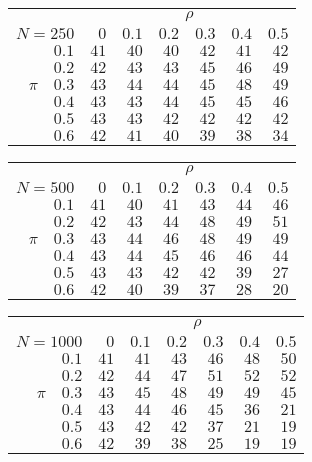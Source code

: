 \begin{tabular}{r|rrrrrr}
\hline\hline
 &\multicolumn{6}{c}{$\rho$} \\ 
 $N = 250$ & $0$ & $0.1$ & $0.2$ & $0.3$ & $0.4$ & $0.5$ \\ 
 \hline$0.1$ & $41$ & $40$ & $40$ & $42$ & $41$ & $42$\\ 
$0.2$ & $42$ & $43$ & $43$ & $45$ & $46$ & $49$\\ 
$\pi\quad$$0.3$ & $43$ & $44$ & $44$ & $45$ & $48$ & $49$\\ 
$0.4$ & $43$ & $43$ & $44$ & $45$ & $45$ & $46$\\ 
$0.5$ & $43$ & $43$ & $42$ & $42$ & $42$ & $42$\\ 
$0.6$ & $42$ & $41$ & $40$ & $39$ & $38$ & $34$\\ 
 \hline 
 \end{tabular}
 
 \vspace{2em} 
 
\begin{tabular}{r|rrrrrr}
\hline\hline
 &\multicolumn{6}{c}{$\rho$} \\ 
 $N = 500$ & $0$ & $0.1$ & $0.2$ & $0.3$ & $0.4$ & $0.5$ \\ 
 \hline$0.1$ & $41$ & $40$ & $41$ & $43$ & $44$ & $46$\\ 
$0.2$ & $42$ & $43$ & $44$ & $48$ & $49$ & $51$\\ 
$\pi\quad$$0.3$ & $43$ & $44$ & $46$ & $48$ & $49$ & $49$\\ 
$0.4$ & $43$ & $44$ & $45$ & $46$ & $46$ & $44$\\ 
$0.5$ & $43$ & $43$ & $42$ & $42$ & $39$ & $27$\\ 
$0.6$ & $42$ & $40$ & $39$ & $37$ & $28$ & $20$\\ 
 \hline 
 \end{tabular}
 
 \vspace{2em} 
 
\begin{tabular}{r|rrrrrr}
\hline\hline
 &\multicolumn{6}{c}{$\rho$} \\ 
 $N = 1000$ & $0$ & $0.1$ & $0.2$ & $0.3$ & $0.4$ & $0.5$ \\ 
 \hline$0.1$ & $41$ & $41$ & $43$ & $46$ & $48$ & $50$\\ 
$0.2$ & $42$ & $44$ & $47$ & $51$ & $52$ & $52$\\ 
$\pi\quad$$0.3$ & $43$ & $45$ & $48$ & $49$ & $49$ & $45$\\ 
$0.4$ & $43$ & $44$ & $46$ & $45$ & $36$ & $21$\\ 
$0.5$ & $43$ & $42$ & $42$ & $37$ & $21$ & $19$\\ 
$0.6$ & $42$ & $39$ & $38$ & $25$ & $19$ & $19$\\ 
 \hline 
 \end{tabular}